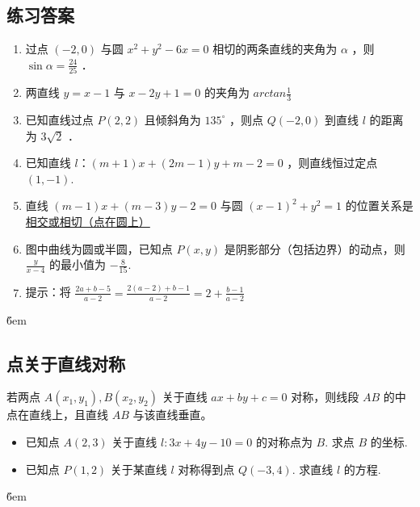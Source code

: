 \subsection{练习答案}
\begin{tips}
    \begin{enumerate}
        \item 过点 $(-2,0)$ 与圆 $x^2+y^2-6 x=0$ 相切的两条直线的夹角为 $\alpha$ ，则 $\sin \alpha= \frac{24}{25}$ ．
        \item 两直线 $y=x-1$ 与 $x-2 y+1=0$ 的夹角为 $arctan\frac{1}{3}$
        \item 已知直线过点 $P(2,2)$ 且倾斜角为 $135^{\circ}$ ，则点 $Q(-2,0)$ 到直线 $l$ 的距离为 $3\sqrt{2}$ ．
        \item 已知直线 $l$：$(m+1) x+(2 m-1) y+m-2=0$ ，则直线恒过定点 \underline{$(1,-1)$}.
        \item 直线 $(m-1) x+(m-3) y-2=0$ 与圆 $(x-1)^2+y^2=1$ 的位置关系是 \underline{相交或相切（点在圆上）}
        \item 图中曲线为圆或半圆，已知点 $P(x, y)$ 是阴影部分（包括边界）的动点，则 $\frac{y}{x-4}$ 的最小值为 $-\frac{8}{15}$.
        \item 提示：将 $\frac{2 a+b-5}{a-2}=\frac{2(a-2)+b-1}{a-2}=2+\frac{b-1}{a-2}$
    \end{enumerate}
\end{tips}

\v{6em}

\subsection{点关于直线对称}

\begin{theorem}[点关于直线的对称]
    若两点 $A(x_1, y_1), B(x_2, y_2)$ 关于直线 $ax+by+c=0$ 对称，则线段 $AB$ 的中点在直线上，且直线 $AB$ 与该直线垂直。
\end{theorem}

\begin{example}
    \begin{itemize}
        \item[(1)] 已知点 $A(2,3)$ 关于直线 $l: 3x+4y-10=0$ 的对称点为 $B$. 求点 $B$ 的坐标.

        \item[(2)] 已知点 $P(1,2)$ 关于某直线 $l$ 对称得到点 $Q(-3,4)$. 求直线 $l$ 的方程.
    \end{itemize}
\end{example}

\v{6em}

